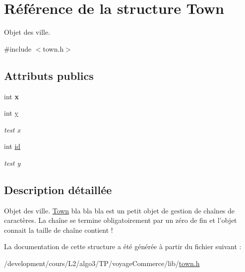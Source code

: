 \hypertarget{structTown}{
\section{Référence de la structure Town}
\label{structTown}
}


Objet des ville.  




{\ttfamily \#include $<$town.h$>$}

\subsection*{Attributs publics}
\begin{DoxyCompactItemize}
\item 
\hypertarget{structTown_a94ac9f23445b2bc5d3f148b9ae044c04}{
int {\bfseries x}}
\label{structTown_a94ac9f23445b2bc5d3f148b9ae044c04}

\item 
\hypertarget{structTown_ad0221f06d5fafb6e677034f3e95f23f2}{
int \hyperlink{structTown_ad0221f06d5fafb6e677034f3e95f23f2}{y}}
\label{structTown_ad0221f06d5fafb6e677034f3e95f23f2}

\begin{DoxyCompactList}\small\item\em test x \item\end{DoxyCompactList}\item 
\hypertarget{structTown_a3fd25ddbb4f43f39fb8ccd507c8b8b2b}{
int \hyperlink{structTown_a3fd25ddbb4f43f39fb8ccd507c8b8b2b}{id}}
\label{structTown_a3fd25ddbb4f43f39fb8ccd507c8b8b2b}

\begin{DoxyCompactList}\small\item\em test y \item\end{DoxyCompactList}\end{DoxyCompactItemize}


\subsection{Description détaillée}
Objet des ville. \hyperlink{structTown}{Town} bla bla bla est un petit objet de gestion de chaînes de caractères. La chaîne se termine obligatoirement par un zéro de fin et l'objet connait la taille de chaîne contient ! 

La documentation de cette structure a été générée à partir du fichier suivant :\begin{DoxyCompactItemize}
\item 
/development/cours/L2/algo3/TP/voyageCommerce/lib/\hyperlink{town_8h}{town.h}\end{DoxyCompactItemize}
